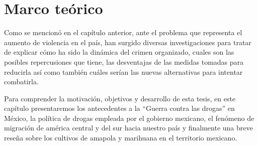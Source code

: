 \chapter{Marco teórico} \label{chap:background}

Como se mencionó en el capítulo anterior, ante el problema que representa el aumento de violencia en el país, han surgido diversas investigaciones para tratar de explicar cómo ha sido la dinámica del crimen organizado, cuales son las posibles repercusiones que tiene, las desventajas de las medidas tomadas para reducirla así como también cuáles serían las nuevas alternativas para intentar combatirla.

Para comprender la motivación, objetivos y desarrollo de esta tesis, en este capítulo presentaremos los antecedentes a la ``Guerra contra las drogas'' en México, la política de drogas empleada por el gobierno mexicano, el fenómeno de migración de américa central y del sur hacia nuestro país y finalmente una breve reseña sobre los cultivos de amapola y marihuana en el territorio mexicano.